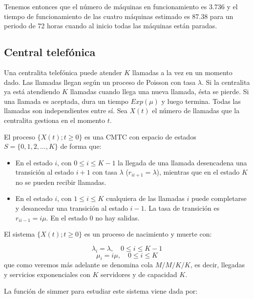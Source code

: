 \documentclass[
]{book}
\theoremstyle{definition}
\theoremstyle{definition}
\theoremstyle{definition}
\theoremstyle{definition}
\theoremstyle{remark}
\begin{document}
Tenemos entonces que el número de máquinas en funcionamiento es 3.736 y el tiempo de funcionamiento de las cuatro máquinas estimado es 87.38 para un periodo de 72 horas cuando al inicio todas las máquinas están paradas.

\hypertarget{central-telefuxf3nica}{%
\subsection{Central telefónica}\label{central-telefuxf3nica}}

Una centralita telefónica puede atender \(K\) llamadas a la vez en un momento dado. Las llamadas llegan según un proceso de Poisson con tasa \(\lambda\). Si la centralita ya está atendiendo \(K\) llamadas cuando llega una nueva llamada, ésta se pierde. Si una llamada es aceptada, dura un tiempo \(Exp(\mu)\) y luego termina. Todas las llamadas son independientes entre sí. Sea \(X(t)\) el número de llamadas que la centralita gestiona en el momento \(t\).

El proceso \(\{X(t); t \geq 0\}\) es una CMTC con espacio de estados \(S = \{0, 1, 2,...,K\}\) de forma que:

\begin{itemize}
\item
  En el estado \(i\), con \(0 \leq i \leq K-1\) la llegada de una llamada desencadena una transición al estado \(i+1\) con tasa \(\lambda\) (\(r_{i i+1} = \lambda\)), mientras que en el estado \(K\) no se pueden recibir llamadas.
\item
  En el estado \(i\), con \(1 \leq i \leq K\) cualquiera de las llamadas \(i\) puede completarse y desancedar una transición al estado \(i-1\). La tasa de transición es \(r_{i i-1} = i\mu\). En el estado 0 no hay salidas.
\end{itemize}

El sistema \(\{X(t); t \geq 0\}\) es un proceso de nacimiento y muerte con:

\[\lambda_i = \lambda, \quad 0 \leq i \leq K-1\]
\[\mu_i = i\mu, \quad 0 \leq i \leq K\]
que como veremos más adelante se denomina cola \(M/M/K/K\), es decir, llegadas y servicios exponenciales con \(K\) servidores y de capacidad \(K\).

La función de simmer para estudiar este sistema viene dada por:
\end{document}

